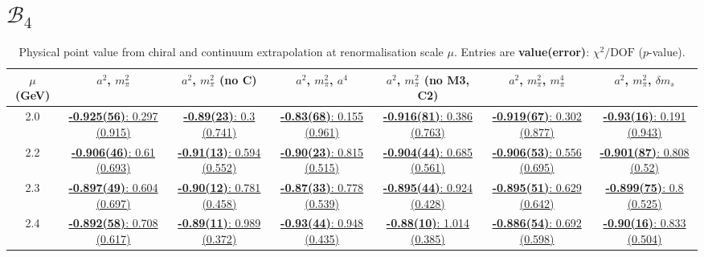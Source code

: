 \documentclass[12pt]{extarticle}
\begin{document}
\section{$\mathcal{B}_4$}
\begin{table}[h!]
\begin{center}
\begin{tabular}{|c|c|c|c|c|c|c|}
\hline
$\mu$ (GeV) & $a^2$, $m_\pi^2$& $a^2$, $m_\pi^2$ (no C)& $a^2$, $m_\pi^2$, $a^4$& $a^2$, $m_\pi^2$ (no M3, C2)& $a^2$, $m_\pi^2$, $m_\pi^4$& $a^2$, $m_\pi^2$, $\delta m_s$\\
\hline
2.0& \hyperlink{SSpPP/NPR/a2m2_20.pdf.1}{\textbf{-0.925(56)}: 0.297 (0.915)} & \hyperlink{SSpPP/NPR/a2m2noC_20.pdf.1}{\textbf{-0.89(23)}: 0.3 (0.741)} & \hyperlink{SSpPP/NPR/a2a4m2_20.pdf.1}{\textbf{-0.83(68)}: 0.155 (0.961)} & \hyperlink{SSpPP/NPR/a2m2mcut_20.pdf.1}{\textbf{-0.916(81)}: 0.386 (0.763)} & \hyperlink{SSpPP/NPR/a2m2m4_20.pdf.1}{\textbf{-0.919(67)}: 0.302 (0.877)} & \hyperlink{SSpPP/NPR/a2m2delm_20.pdf.1}{\textbf{-0.93(16)}: 0.191 (0.943)}\\
2.2& \hyperlink{SSpPP/NPR/a2m2_22.pdf.1}{\textbf{-0.906(46)}: 0.61 (0.693)} & \hyperlink{SSpPP/NPR/a2m2noC_22.pdf.1}{\textbf{-0.91(13)}: 0.594 (0.552)} & \hyperlink{SSpPP/NPR/a2a4m2_22.pdf.1}{\textbf{-0.90(23)}: 0.815 (0.515)} & \hyperlink{SSpPP/NPR/a2m2mcut_22.pdf.1}{\textbf{-0.904(44)}: 0.685 (0.561)} & \hyperlink{SSpPP/NPR/a2m2m4_22.pdf.1}{\textbf{-0.906(53)}: 0.556 (0.695)} & \hyperlink{SSpPP/NPR/a2m2delm_22.pdf.1}{\textbf{-0.901(87)}: 0.808 (0.52)}\\
2.3& \hyperlink{SSpPP/NPR/a2m2_23.pdf.1}{\textbf{-0.897(49)}: 0.604 (0.697)} & \hyperlink{SSpPP/NPR/a2m2noC_23.pdf.1}{\textbf{-0.90(12)}: 0.781 (0.458)} & \hyperlink{SSpPP/NPR/a2a4m2_23.pdf.1}{\textbf{-0.87(33)}: 0.778 (0.539)} & \hyperlink{SSpPP/NPR/a2m2mcut_23.pdf.1}{\textbf{-0.895(44)}: 0.924 (0.428)} & \hyperlink{SSpPP/NPR/a2m2m4_23.pdf.1}{\textbf{-0.895(51)}: 0.629 (0.642)} & \hyperlink{SSpPP/NPR/a2m2delm_23.pdf.1}{\textbf{-0.899(75)}: 0.8 (0.525)}\\
2.4& \hyperlink{SSpPP/NPR/a2m2_24.pdf.1}{\textbf{-0.892(58)}: 0.708 (0.617)} & \hyperlink{SSpPP/NPR/a2m2noC_24.pdf.1}{\textbf{-0.89(11)}: 0.989 (0.372)} & \hyperlink{SSpPP/NPR/a2a4m2_24.pdf.1}{\textbf{-0.93(44)}: 0.948 (0.435)} & \hyperlink{SSpPP/NPR/a2m2mcut_24.pdf.1}{\textbf{-0.88(10)}: 1.014 (0.385)} & \hyperlink{SSpPP/NPR/a2m2m4_24.pdf.1}{\textbf{-0.886(54)}: 0.692 (0.598)} & \hyperlink{SSpPP/NPR/a2m2delm_24.pdf.1}{\textbf{-0.90(16)}: 0.833 (0.504)}\\
\hline
\end{tabular}
\caption{Physical point value from chiral and continuum extrapolation at renormalisation scale $\mu$. Entries are \textbf{value(error)}: $\chi^2/\text{DOF}$ ($p$-value).}
\end{center}
\end{table}
\end{document}
